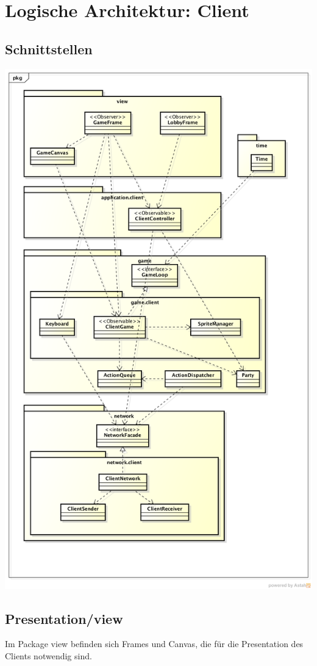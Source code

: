 \documentclass[11pt]{scrartcl}
\begin{document}
\section{Logische Architektur: Client}
\subsection{Schnittstellen}
\includegraphics[scale=0.4]{LogischeSichtClient}
\newpage

\subsection{Presentation/view}
Im Package view befinden sich Frames und Canvas, die für die Presentation des Clients notwendig sind.
\end{document}

